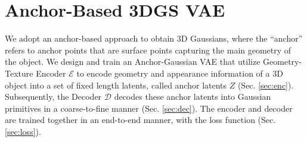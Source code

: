 \section{Anchor-Based 3DGS VAE}
\label{sec:anchor-vae}



We adopt an anchor-based approach to obtain 3D Gaussians, where the ``anchor'' refers to anchor points that are surface points capturing the main geometry of the object. 
%
We design and train an Anchor-Gaussian VAE that utilize 
%
Geometry-Texture Encoder $\mathcal{E}$ to encode 
geometry and appearance information
of a 3D object 
into a set of fixed length latents, called anchor latents $Z$ (Sec. \ref{sec:enc}). Subsequently, the Decoder $\mathcal{D}$  decodes these anchor latents into Gaussian primitives in a coarse-to-fine manner (Sec. \ref{sec:dec}). The encoder and decoder are trained together in an end-to-end manner, with the loss function (Sec. \ref{sec:loss}).

